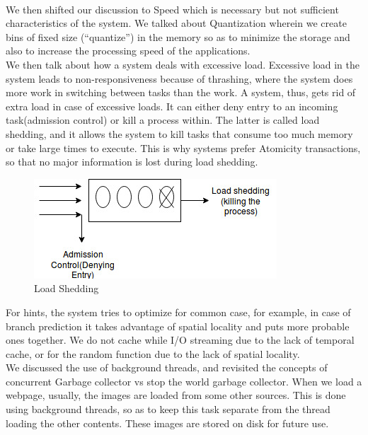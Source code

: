 \documentclass[twoside]{article}
\begin{document}
\\
We then shifted our discussion to Speed which is necessary but not sufficient characteristics of the system. We talked about Quantization wherein we create bins of fixed size (“quantize”) in the memory so as to minimize the storage and also to increase the processing  speed of the applications. 
\\
We then talk about how a system deals with excessive load. Excessive load in the system leads to non-responsiveness because of thrashing, where the system does more work in switching between tasks than the work. A system, thus, gets rid of extra load in case of excessive loads. It can either deny entry to an incoming task(admission control) or kill a process within. The latter is called load shedding, and it allows the system to kill tasks that consume too much memory or take large times to execute. This is why systems prefer Atomicity transactions, so that no major information is lost during load shedding.

\begin{figure}[!h]
    \centering
    \includegraphics{Diagram.jpg}
    \caption{Load Shedding}
    \label{Load Shedding}
\end{figure}

For hints, the system tries to optimize for common case, for example, in case of branch prediction it takes advantage of spatial locality and puts more probable ones together. We do not cache while I/O streaming due to the lack of temporal cache, or for the random function due to the lack of spatial locality.\\
We discussed the use of background threads, and revisited the concepts of concurrent Garbage collector vs stop the world garbage collector. When we load a webpage, usually, the images are loaded from some other sources. This is done using background threads, so as to keep this task separate from the thread loading the other contents. These images are stored on disk for future use.
\end{document}
